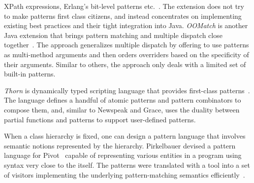 XPath expressions, Erlang's bit-level patterns etc.~\cite{padl08}. The extension 
does not try to make patterns first class citizens, and instead concentrates on 
implementing existing best practices and their tight integration into Java. %
%
\emph{OOMatch} is another Java extension that brings pattern matching and multiple 
dispatch close together~\cite{OOMatch07thesis}. The approach generalizes 
multiple dispatch by offering to use patterns as multi-method arguments and then 
orders overriders based on the specificity of their arguments. %
Similar to others, the approach only deals with a limited set of built-in patterns.

\emph{Thorn} is dynamically typed scripting language that provides first-class 
patterns~\cite{Thorn2012}. %
The language defines a handful 
of atomic patterns and pattern combinators to compose them, and, similar to 
Newspeak and Grace, uses the duality between partial functions and patterns to 
support user-defined patterns. %


When a class hierarchy is fixed, one can design a pattern language that involves 
semantic notions represented by the hierarchy. Pirkelbauer devised a pattern 
language for Pivot~\cite{Pivot09} capable of representing various entities in a 
\Cpp{} program using syntax very close to the \Cpp{} itself. The patterns were 
translated with a tool into a set of visitors implementing the underlying 
pattern-matching semantics efficiently~\cite{PirkelbauerThesis}. %
